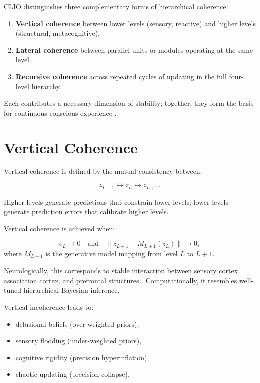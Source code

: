 \documentclass[12pt,oneside]{book}
\theoremstyle{plain}
\theoremstyle{definition}
\let\citep\parencite
\begin{document}
CLIO distinguishes three complementary forms of hierarchical coherence:

\begin{enumerate}
    \item \textbf{Vertical coherence}
    between lower levels (sensory, reactive) and higher levels
    (structural, metacognitive).

    \item \textbf{Lateral coherence}
    between parallel units or modules operating at the same level.

    \item \textbf{Recursive coherence}
    across repeated cycles of updating in the full four-level hierarchy.
\end{enumerate}

Each contributes a necessary dimension of stability; together, they form the
basis for continuous conscious experience \citep{dehaene2014consciousness}.

\section{Vertical Coherence}

Vertical coherence is defined by the mutual consistency between:

\[
z_{L-1} \leftrightarrow z_{L} \leftrightarrow z_{L+1}.
\]

Higher levels generate predictions that constrain lower levels; lower levels
generate prediction errors that calibrate higher levels.

Vertical coherence is achieved when:

\[
e_L \rightarrow 0 \quad \text{and} \quad
\| z_{L+1} - M_{L+1}(z_L) \| \rightarrow 0,
\]
where $M_{L+1}$ is the generative model mapping from level $L$ to $L+1$.

Neurologically, this corresponds to stable interaction between sensory cortex,
association cortex, and prefrontal structures
\citep{friston2017active,bastos2012canonical}.
Computationally, it resembles well-tuned hierarchical Bayesian inference.

Vertical incoherence leads to:

\begin{itemize}
    \item delusional beliefs (over-weighted priors),
    \item sensory flooding (under-weighted priors),
    \item cognitive rigidity (precision hyperinflation),
    \item chaotic updating (precision collapse).
\end{itemize}
\end{document}
